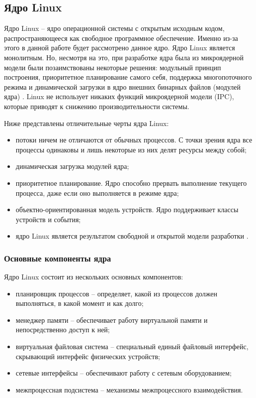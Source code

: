\subsection{Ядро Linux}

Ядро Linux \cite{linux} -- ядро операционной системы с открытым исходным кодом, распространяющееся как свободное программное обеспечение. Именно из-за этого в данной работе будет рассмотрено данное ядро. Ядро Linux является монолитным. Но, несмотря на это, при разработке ядра была из микроядерной модели были позаимствованы некоторые решения: модульный принцип построения, приоритетное планирование самого себя, поддержка многопоточного режима и динамической загрузки в ядро внешних бинарных файлов (модулей ядра) \cite{kernel-development}. Linux не использует никаких функций микроядерной модели (IPC), которые приводят к снижению производительности системы.

Ниже представлены отличительные черты ядра Linux:

\begin{itemize}
	\item потоки ничем не отличаются от обычных процессов. С точки зрения ядра все процессы одинаковы и лишь некоторые из них делят ресурсы между собой;
	\item динамическая загрузка модулей ядра;
	\item приоритетное планирование. Ядро способно прервать выполнение текущего процесса, даже если оно выполняется в режиме ядра;
	\item объектно-ориентированная модель устройств. Ядро поддерживает классы устройств и события;
	\item ядро Linux является результатом свободной и открытой модели разработки \cite{kernel-development}.
\end{itemize}

\subsubsection{Основные компоненты ядра}

Ядро Linux состоит из нескольких основных компонентов:

\begin{itemize}
	\item планировщик процессов -- определяет, какой из процессов должен выполняться, в какой момент и как долго;
	\item менеджер памяти -- обеспечивает работу виртуальной памяти и непосредственно доступ к ней;
	\item виртуальная файловая система -- специальный единый файловый интерфейс, скрывающий интерфейс физических устройств;
	\item сетевые интерфейсы -- обеспечивают работу с сетевым оборудованием;
	\item межпроцессная подсистема -- механизмы межпроцессного взаимодействия.
\end{itemize}

